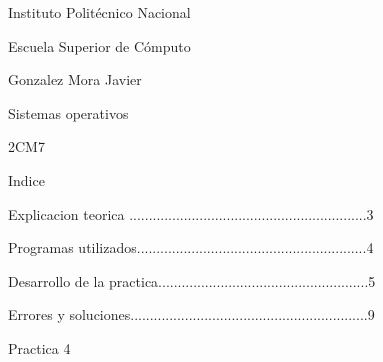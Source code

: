 \documentclass[12pt, a4paper]{report}
\begin{document}
\begin{LARGE}
\begin{center}

Instituto Politécnico Nacional

\bigskip
\bigskip

Escuela Superior de Cómputo

\bigskip
\bigskip

Gonzalez Mora Javier

\bigskip
\bigskip

Sistemas operativos

\bigskip
\bigskip

2CM7


\end{center}
\end{LARGE}

\newpage

\begin{center}

Indice

\end{center}

\bigskip
\bigskip

\begin{flushleft}
Explicacion teorica .............................................................3

\bigskip

Programas utilizados...........................................................4

\bigskip

Desarrollo de la practica......................................................5

\bigskip

Errores y soluciones.............................................................9

\bigskip

\end{flushleft}

\bigskip
\bigskip

\bigskip

\newpage




\begin{center}

Practica 4

\end{center}
\end{document}
